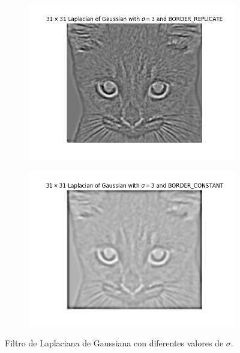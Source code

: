 \documentclass[11pt,a4paper]{article}
\begin{document}
\begin{figure}[H]
\begin{subfigure}{.5\textwidth}
	\centering
	\includegraphics[scale=0.45]{img/laplacian-border1.png}
	\label{fig:laplacian-border1}
\end{subfigure}
\begin{subfigure}{.5\textwidth}
	\centering
	\includegraphics[scale=0.45]{img/laplacian-border2.png}
	\label{fig:laplacian-border2}
\end{subfigure}
\caption{Filtro de Laplaciana de Gaussiana con diferentes valores de $\sigma$.}
\label{fig:laplacian-border}
\end{figure}
\end{document}
